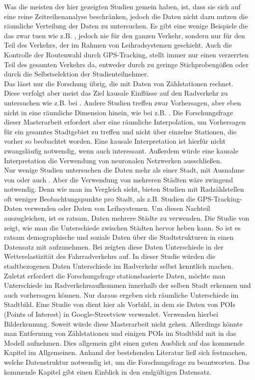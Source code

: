 \documentclass[a4paper,12pt]{thesis}
\begin{document}
Was die meisten der hier gezeigten Studien gemein haben, ist, dass sie sich auf eine reine Zeitreihenanalyse beschränken, jedoch die Daten nicht dazu nutzen die räumliche Verteilung der Daten zu untersuchen. Es gibt eine wenige Beispiele die das zwar tuen wie z.B. \cite{Alattar2021}, jedoch nie für den ganzen Verkehr, sondern nur für den Teil des Verkehrs, der im Rahmen von Leihradsystemen geschieht. Auch die Kontrolle der Routenwahl durch GPS-Tracking, stellt immer nur einen verzerrten Teil des gesamten Verkehrs da, entweder durch zu geringe Stichprobengößen oder durch die Selbstselektion der Studienteilnehmer.\\
Das lässt nur die Forschung übrig, die mit Daten von Zählstationen rechnet. Diese verfolgt aber meist das Ziel kausale Einflüsse auf den Radverkehr zu untersuchen wie z.B. bei \cite{Wessel2020}. Andere Studien treffen zwar Vorhersagen, aber eben nicht in eine räumliche Dimension hinein, wie bei z.B. \cite{Holmgren2017}. Die Forschungsfrage dieser Masterarbeit erfordert aber eine räumliche Interpolation, um Vorhersagen für ein gesamtes Stadtgebiet zu treffen und nicht über einzelne Stationen, die vorher so beobachtet worden. Eine kausale Interpretation ist hierfür nicht zwangsläufig notwendig, wenn auch interessant. Außerdem würde eine kausale Interpretation die Verwendung von neuronalen Netzwerken ausschließen.\\
Nur wenige Studien untersuchen die Daten mehr als einer Stadt, mit Ausnahme von \cite{Wessel2020} oder auch \cite{Li2022}. Aber die Verwendung von mehreren Städten wäre zwingend notwendig. Denn wie man im Vergleich sieht, bieten Studien mit Radzählstellen oft weniger Beobachtungspunkte pro Stadt, als z.B. Studien die GPS-Tracking-Daten verwenden oder Daten von Leihsystemen. Um diesen Nachteil auszugleichen, ist es ratsam, Daten mehrere Städte zu verwenden. Die Studie von \cite{Goldmann2021} zeigt, wie man die Unterschiede zwischen Städten hervor heben kann. So ist es ratsam demographische und soziale Daten über die Stadtstrukturen in einen Datensatz mit aufzunehmen. Bei \cite{Goldmann2021} zeigten diese Daten Unterschiede in der Wetterelastizität des Fahrradverkehrs auf. In dieser Studie würden die stadtbezogenen Daten Unterschiede im Radverkehr selbst kenntlich machen.\\
Zuletzt erfordert die Forschungsfrage stationsbasierte Daten, möchte man Unterschiede im Radverkehrsaufkommen innerhalb der selben Stadt erkennen und auch vorhersagen können. Nur daraus ergeben sich räumliche Unterschiede im Stadtbild. Eine Studie von \cite{HANKEY2021102651} dient hier als Vorbild, in dem sie Daten von POIs (Points of Interest) in Google-Streetview verwendet. \cite{HANKEY2021102651} Verwenden hierbei Bilderkennung. Soweit würde diese Masterarbeit nicht gehen. Allerdings könnte man Entfernung von Zählstationen und einigen POIs im Stadtbild mit in das Modell aufnehmen. Dies allgemein gibt einen guten Ausblick auf das kommende Kapitel im Allgemeinen. Anhand der bestehenden Literatur ließ sich festmachen, welche Datenstruktur notwendig ist, um die Forschungsfrage zu beantworten. Das kommende Kapitel gibt einen Einblick in den endgültigen Datensatz.
\end{document}
